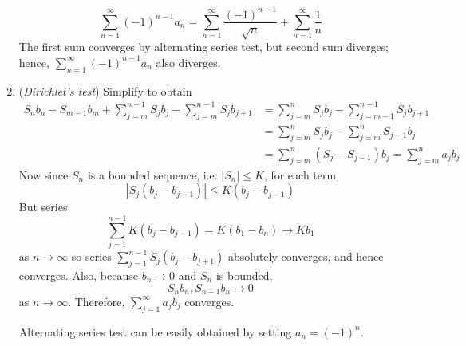 \documentclass[10pt, a4paper, twoside]{report}
\begin{document}
\begin{enumerate}[{1.}]
    \[\sum_{n=1}^{\infty}(-1)^{n-1}a_n=\sum_{n=1}^{\infty}\frac{(-1)^{n-1}}{\sqrt{n}}+\sum_{n=1}^{\infty}\frac 1n\]
    The first sum converges by alternating series test, but second sum diverges; \newline hence, \(\sum_{n=1}^{\infty}(-1)^{n-1}a_n\) also diverges.
    \item (\emph{Dirichlet's test}) Simplify to obtain 
    \begin{align*}
        S_nb_n-S_{m-1}b_m+\sum_{j=m}^{n-1}S_jb_j-\sum_{j=m}^{n-1}S_jb_{j+1}&=\sum_{j=m}^nS_jb_j-\sum_{j=m-1}^{n-1}S_jb_{j+1} \\
        &=\sum_{j=m}^nS_jb_j-\sum_{j=m}^nS_{j-1}b_j \\
        &=\sum_{j=m}^n(S_j-S_{j-1})b_j=\sum_{j=m}^na_jb_j
    \end{align*}
    Now since \(S_n\) is a bounded sequence, i.e. \(|S_n|\leq K\), for each term
    \[\left|S_j(b_j-b_{j-1})\right|\leq K(b_j-b_{j-1})\]
    But series 
    \[\sum_{j=1}^{n-1}K(b_j-b_{j-1})=K(b_1-b_n)\to Kb_1\]
    as \(n\to\infty\) so series \(\sum_{j=1}^{n-1}S_j(b_j-b_{j+1})\) absolutely converges, and hence converges. Also, because \(b_n\to 0\) and \(S_n\) is bounded, \[S_nb_n,S_{n-1}b_n\to 0\] as \(n\to\infty\). Therefore, \(\sum_{j=1}^\infty a_jb_j\) converges.

    Alternating series test can be easily obtained by setting \(a_n=(-1)^n\).


\end{enumerate}
\end{document}

